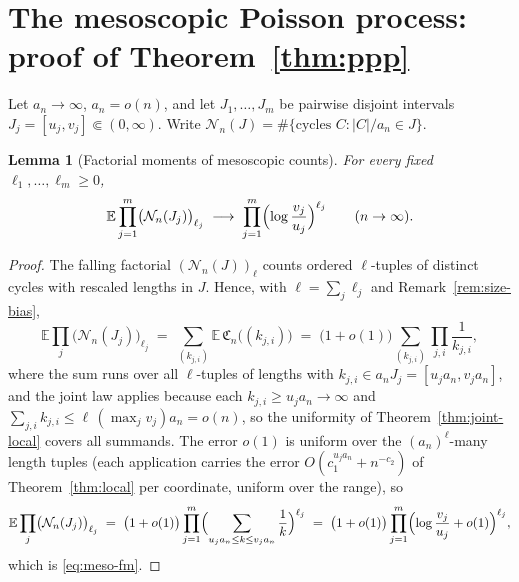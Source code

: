 \documentclass[11pt]{article}
\newcommand{\E}{\mathbb{E}}
\newcommand{\1}{\mathbf{1}}
\newcommand{\cN}{\mathcal{N}}
\newtheorem{lemma}[theorem]{Lemma}
\theoremstyle{remark}
\begin{document}
\section{The mesoscopic Poisson process: proof of Theorem~\ref{thm:ppp}}\label{sec:ppp}

Let $a_n\to\infty$, $a_n=o(n)$, and let $J_1,\dots,J_m$ be pairwise disjoint
intervals $J_j=[u_j,v_j]\Subset(0,\infty)$. Write
$\cN_n(J)=\#\{\text{cycles }C:|C|/a_n\in J\}$.

\begin{lemma}[Factorial moments of mesoscopic counts]\label{lem:meso-fm}
For every fixed $\ell_1,\dots,\ell_m\ge0$,
\begin{equation}\label{eq:meso-fm}
\E\prod_{j=1}^m\bigl(\cN_n(J_j)\bigr)_{\ell_j}
\;\longrightarrow\;\prod_{j=1}^m\Bigl(\log\frac{v_j}{u_j}\Bigr)^{\ell_j}
\qquad(n\to\infty).
\end{equation}
\end{lemma}

\begin{proof}
The falling factorial $(\cN_n(J))_\ell$ counts ordered $\ell$-tuples of
distinct cycles with rescaled lengths in $J$. Hence, with
$\ell=\sum_j\ell_j$ and Remark~\ref{rem:size-bias},
\[
\E\prod_j\bigl(\cN_n(J_j)\bigr)_{\ell_j}
\;=\;\sum_{(k_{j,i})}\E\,\mathfrak{C}_n\bigl((k_{j,i})\bigr)
\;=\;\bigl(1+o(1)\bigr)\sum_{(k_{j,i})}\prod_{j,i}\frac1{k_{j,i}},
\]
where the sum runs over all $\ell$-tuples of lengths with
$k_{j,i}\in a_nJ_j=[u_ja_n,v_ja_n]$, and the joint law applies because each
$k_{j,i}\ge u_ja_n\to\infty$ and
$\sum_{j,i}k_{j,i}\le\ell\,(\max_jv_j)a_n=o(n)$, so the uniformity of
Theorem~\ref{thm:joint-local} covers all summands. The error $o(1)$ is
uniform over the $(a_n)^\ell$-many length tuples (each application carries
the error $O(c_1^{u_ja_n}+n^{-c_2})$ of Theorem~\ref{thm:local} per
coordinate, uniform over the range), so
\[
\E\prod_j\bigl(\cN_n(J_j)\bigr)_{\ell_j}
\;=\;\bigl(1+o(1)\bigr)\prod_{j=1}^m
\Bigl(\sum_{u_ja_n\le k\le v_ja_n}\frac1k\Bigr)^{\ell_j}
\;=\;\bigl(1+o(1)\bigr)\prod_{j=1}^m
\Bigl(\log\frac{v_j}{u_j}+o(1)\Bigr)^{\ell_j},
\]
which is \eqref{eq:meso-fm}.
\end{proof}
\end{document}
